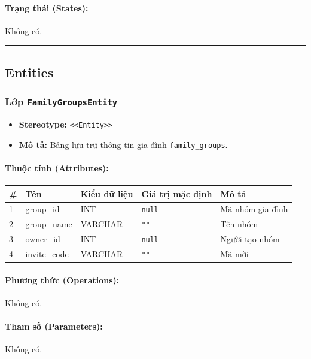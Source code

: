 \documentclass[12pt,a4paper]{article}
\begin{document}
\paragraph{Trạng thái (States):}
Không có.

\vskip 0.5cm
\noindent\rule{\textwidth}{0.5pt}
\vskip 0.5cm

\subsection{Entities}


\subsubsection{Lớp \texttt{FamilyGroupsEntity}}

\begin{itemize}[leftmargin=*]
    \item \textbf{Stereotype:} \texttt{\textless{}\textless{}Entity\textgreater{}\textgreater{}}
    \item \textbf{Mô tả:} Bảng lưu trữ thông tin gia đình \texttt{family\_groups}.
\end{itemize}

\paragraph{Thuộc tính (Attributes):}
\begin{longtable}{|p{0.6cm}|p{3.5cm}|p{2.4cm}|p{1.8cm}|p{5.1cm}|}
\hline
\textbf{\#} & \textbf{Tên} & \textbf{Kiểu dữ liệu} & \textbf{Giá trị mặc định} & \textbf{Mô tả} \\ \hline
\endhead
1 & group\_id & INT & \texttt{null} & Mã nhóm gia đình \\ \hline
2 & group\_name & VARCHAR & \texttt{""} & Tên nhóm \\ \hline
3 & owner\_id & INT & \texttt{null} & Người tạo nhóm \\ \hline
4 & invite\_code & VARCHAR & \texttt{""} & Mã mời \\ \hline
\end{longtable}

\paragraph{Phương thức (Operations):}
Không có.

\paragraph{Tham số (Parameters):}
Không có.
\end{document}
